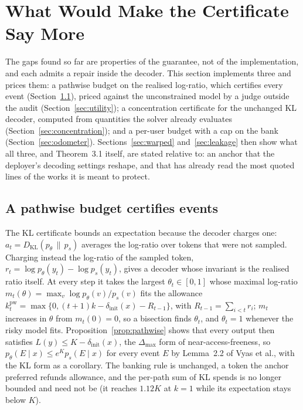 \section{What Would Make the Certificate Say More}\label{sec:certificates}

The gaps found so far are properties of the guarantee, not of the implementation, and each admits a repair inside the decoder. This section implements three and prices them: a pathwise budget on the realised log-ratio, which certifies every event (Section~\ref{sec:pathwise}), priced against the unconstrained model by a judge outside the audit (Section~\ref{sec:utility}); a concentration certificate for the unchanged KL decoder, computed from quantities the solver already evaluates (Section~\ref{sec:concentration}); and a per-user budget with a cap on the bank (Section~\ref{sec:odometer}). Sections~\ref{sec:warped} and~\ref{sec:leakage} then show what all three, and Theorem~3.1 itself, are stated relative to: an anchor that the deployer's decoding settings reshape, and that has already read the most quoted lines of the works it is meant to protect.

\subsection{A pathwise budget certifies events}\label{sec:pathwise}
The KL certificate bounds an expectation because the decoder charges one: $a_t = D_{\mathrm{KL}}(p_\theta \,\|\, p_s)$ averages the log-ratio over tokens that were not sampled. Charging instead the log-ratio of the sampled token, $r_t = \log p_\theta(y_t) - \log p_s(y_t)$, gives a decoder whose invariant is the realised ratio itself. At every step it takes the largest $\theta_t \in [0, 1]$ whose maximal log-ratio $m_t(\theta) = \max_v \log p_\theta(v)/p_s(v)$ fits the allowance $k^{\mathrm{pw}}_t = \max\{0, (t+1)k - \delta_{\mathrm{init}}(x) - R_{t-1}\}$, with $R_{t-1} = \sum_{i < t} r_i$; $m_t$ increases in $\theta$ from $m_t(0) = 0$, so a bisection finds $\theta_t$, and $\theta_t = 1$ whenever the risky model fits. Proposition~\ref{prop:pathwise} shows that every output then satisfies $L(y) \le K - \delta_{\mathrm{init}}(x)$, the $\Delta_{\max}$ form of near-access-freeness, so $p_\theta(E \mid x) \le e^{K} p_s(E \mid x)$ for every event $E$ by Lemma~2.2 of Vyas et al., with the KL form as a corollary. The banking rule is unchanged, a token the anchor preferred refunds allowance, and the per-path sum of KL spends is no longer bounded and need not be (it reaches $1.12K$ at $k=1$ while its expectation stays below $K$).

